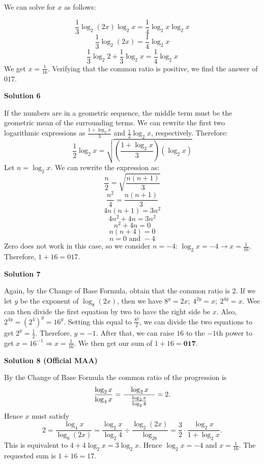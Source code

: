 \begin{enumerate}
 We can solve for $x$ as follows:

 
 \[\frac{1}{3}\log_2{(2x)}\log_2{x}=\frac{1}{4}\log_2{x}\log_2{x}\]
 \[\frac{1}{3}\log_2{(2x)}=\frac{1}{4}\log_2{x}\]
 \[\frac{1}{3}\log_2{2}+\frac{1}{3}\log_2{x}=\frac{1}{4}\log_2{x}\]We get $x=\frac{1}{16}$. Verifying that the common ratio is positive, we find the answer of $\boxed{017}$.

 


 



\textbf{Solution 6}

If the numbers are in a geometric sequence, the middle term must be the geometric mean of the surrounding terms. We can rewrite the first two logarithmic expressions as $\frac{1+\log_2{x}}{3}$ and $\frac{1}{2}\log_2{x}$, respectively. Therefore:
 \[\frac{1}{2}\log_2{x}=\sqrt{\left(\frac{1+\log_2{x}}{3}\right)\left(\log_2{x}\right)}\]Let $n=\log_2{x}$. We can rewrite the expression as:
 \[\frac{n}{2}=\sqrt{\frac{n(n+1)}{3}}\]
 \[\frac{n^2}{4}=\frac{n(n+1)}{3}\]
 \[4n(n+1)=3n^2\]
 \[4n^2+4n=3n^2\]
 \[n^2+4n=0\]
 \[n(n+4)=0\]
 \[n=0 \text{ and } -4\]Zero does not work in this case, so we consider $n=-4$: $\log_2{x}=-4 \rightarrow x=\frac{1}{16}$. Therefore, $1+16=\boxed{017}$.

 



\textbf{Solution 7}

Again, by the Change of Base Formula, obtain that the common ratio is 2. If we let $y$ be the exponent of $\log_8 (2x)$, then we have $8^y=2x;\:4^{2y}=x;\:2^{4y}=x.$ Wee can then divide the first equation by two to have the right side be $x$. Also, $2^{4y}=\left(2^{4}\right)^y=16^y$. Setting this equal to $\frac{8^y}{2}$, we can divide the two equations to get $2^y=\frac12$. Therefore, $y=-1$. After that, we can raise $16$ to the $-1$th power to get $x=16^{-1}\Rightarrow x=\frac1{16}$. We then get our sum of $1+16=\boxed{\textbf{017}}$.

 



\textbf{Solution 8 (Official MAA)}

By the Change of Base Formula the common ratio of the progression is
 \[\frac{\log_2 x}{\log_4 x} = \frac{\hphantom{m}\log_2x\hphantom{m}}{\frac{\log_2x}{\log_24}} = 2.\]Hence $x$ must satisfy
 \[2=\frac{\log_4 x}{\log_8 (2x)}= \frac{\log_2 x}{\log_2 4} \div \frac{\log_2(2x)}{\log_28} = \frac 32\cdot \frac{\log_2x}{1+\log_2x}.\]This is equivalent to $4 + 4\log_2x = 3\log_2x$. Hence $\log_2x = -4$ and $x = \frac{1}{16}$. The requested sum is $1+16 = 17$.


\end{enumerate}
